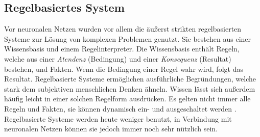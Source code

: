 \subsection{Regelbasiertes System}
Vor neuronalen Netzen wurden vor allem die äußerst strikten regelbasierten Systeme zur Lösung von komplexen Problemen genutzt.
Sie bestehen aus einer Wissensbasis und einem Regelinterpreter.
Die Wissensbasis enthält Regeln, welche aus einer \emph{Atendenz} (Bedingung) und einer \emph{Konsequenz} (Resultat) bestehen, und Fakten.
Wenn die Bedingung einer Regel wahr wird, folgt das Resultat.
Regelbasierte Systeme ermöglichen ausführliche Begründungen, welche stark dem subjektiven menschlichen Denken ähneln.
Wissen lässt sich außerdem häufig leicht in einer solchen Regelform ausdrücken.
Es gelten nicht immer alle Regeln und Fakten, sie können dynamisch ein- und ausgeschaltet werden \citep{rulebasedsystem}.
Regelbasierte Systeme werden heute weniger benutzt, in Verbindung mit neuronalen Netzen können sie jedoch immer noch sehr nützlich sein.
